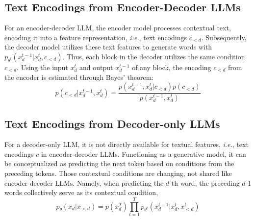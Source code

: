 

\subsection{Text Encodings from Encoder-Decoder LLMs}
For an encoder-decoder LLM, the encoder model processes contextual text, encoding it into a feature representation, \emph{i.e.}, text encodings $c_{<d}$. Subsequently, the decoder model utilizes these text features to generate words with $p_{\theta^t}(x^{t-1}_d|x^t_d, c_{<d})$. Thus, each block in the decoder utilizes the same condition $c_{<d}$.
Using the input $x^t_d$ and output $x^{t-1}_d$ of any block, the encoding $c_{<d}$ from the encoder is estimated through Bayes' theorem:
\begin{equation}
\label{equ:bayes_encoder}
p(c_{<d}|x^{t-1}_d, x^t_d) = \frac{p(x^{t-1}_d, x^t_d|c_{<d})p(c_{<d})}{p(x^{t-1}_d, x^t_d)}
\end{equation}


\subsection{Text Encodings from Decoder-only LLMs}
\label{sec:decoder_encodings}
For a decoder-only LLM, it is not directly available for textual features, \emph{i.e.}, text encodings $c$ in encoder-decoder LLMs. Functioning as a generative model, it can be conceptualized as predicting the next token based on conditions from the preceding tokens. Those contextual conditions are changing, not shared like encoder-decoder LLMs. Namely, when predicting the $d$-th word, the preceding $d$-1 words collectively serve as its contextual condition, %
\begin{equation}
p_{\theta}(x_{d}|x_{<d}) = p(x^T_d) \prod_{t=1}^{T}{p_{\theta^t}(x^{t-1}_d|x^t_d, x^t_{< d})}
\end{equation}


